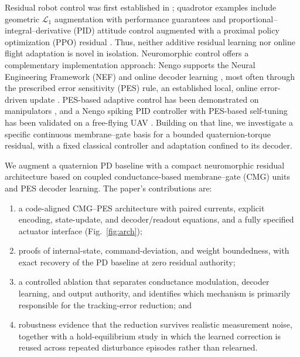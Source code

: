\documentclass[letterpaper, 10 pt, conference]{ieeeconf}
\begin{document}
Residual robot control was first established in \cite{johannink2019}; quadrotor examples include geometric $\mathcal L_1$ augmentation with performance guarantees \cite{wu2025l1quad} and proportional--integral--derivative (PID) attitude control augmented with a proximal policy optimization (PPO) residual \cite{li2027hpappo}. Thus, neither additive residual learning nor online flight adaptation is novel in isolation. Neuromorphic control offers a complementary implementation approach: Nengo supports the Neural Engineering Framework (NEF) and online decoder learning \cite{bekolay2014nengo}, most often through the prescribed error sensitivity (PES) rule, an established local, online error-driven update \cite{voelker2015pes}. PES-based adaptive control has been demonstrated on manipulators \cite{dewolf2016arm,dewolf2020nengo}, and a Nengo spiking PID controller with PES-based self-tuning has been validated on a free-flying UAV \cite{olivares2026selftuning}. Building on that line, we investigate a specific continuous membrane--gate basis for a bounded quaternion-torque residual, with a fixed classical controller and adaptation confined to its decoder.

We augment a quaternion PD baseline with a compact neuromorphic residual architecture based on coupled conductance-based membrane--gate (CMG) units and PES decoder learning. The paper's contributions are:
\begin{enumerate}
    \item a code-aligned CMG--PES architecture with paired currents, explicit encoding, state-update, and decoder/readout equations, and a fully specified actuator interface (Fig.~\ref{fig:arch});
    \item proofs of internal-state, command-deviation, and weight boundedness, with exact recovery of the PD baseline at zero residual authority;
    \item a controlled ablation that separates conductance modulation, decoder learning, and output authority, and identifies which mechanism is primarily responsible for the tracking-error reduction; and
    \item robustness evidence that the reduction survives realistic measurement noise, together with a hold-equilibrium study in which the learned correction is reused across repeated disturbance episodes rather than relearned.
\end{enumerate}

\end{document}
